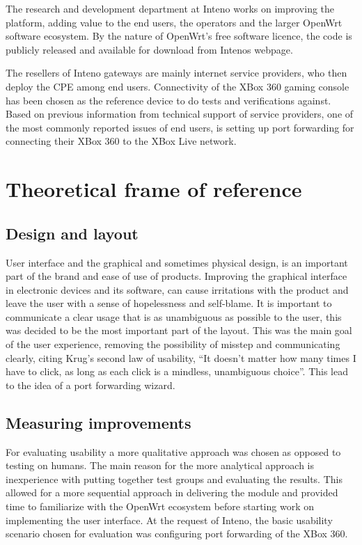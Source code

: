 \documentclass[a4paper,11pt,makeidx]{kth-bcs}
\begin{document}
The research and development department at Inteno works on improving the platform, adding value to the end users, the operators and the larger OpenWrt software ecosystem.
By the nature of OpenWrt's free software licence\cite{gnu-license}, the code is publicly released and available for download from Intenos webpage.\cite{inteno_gpl}

The resellers of Inteno gateways are mainly internet service providers, who then deploy the CPE among end users.
Connectivity of the XBox 360 gaming console has been chosen as the reference device to do tests and verifications against.
Based on previous information from technical support of service providers, one of the most commonly reported issues of end users, is setting up port forwarding for connecting their XBox 360 to the XBox Live network.

\chapter{Theoretical frame of reference}

\section{Design and layout}
User interface and the graphical and sometimes physical design, is an important part of the brand and ease of use of products.
Improving the graphical interface in electronic devices and its software, can cause irritations with the product and leave the user with a sense of hopelessness and self-blame.\cite[p.~34]{norman2002design}
It is important to communicate a clear usage that is as unambiguous as possible to the user, this was decided to be the most important part of the layout.
This was the main goal of the user experience, removing the possibility of misstep and communicating clearly, citing Krug's second law of usability\cite[p.~41]{krug2006don}, ``It doesn’t matter how many times I have to click, as long as each click is a mindless, unambiguous choice''.
This lead to the idea of a port forwarding wizard.

\section{Measuring improvements}
For evaluating usability a more qualitative approach was chosen as opposed to testing on humans.
The main reason for the more analytical approach is inexperience with putting together test groups and evaluating the results.
This allowed for a more sequential approach in delivering the module and provided time to familiarize with the OpenWrt ecosystem before starting work on implementing the user interface.
At the request of Inteno, the basic usability scenario chosen for evaluation was configuring port forwarding of the XBox 360.
\end{document}
